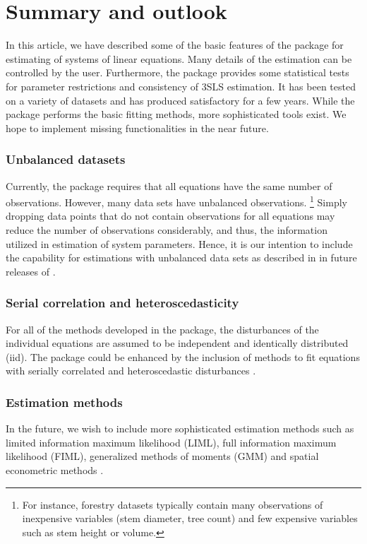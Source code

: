 

\section{Summary and outlook}\label{sec:Summmary}
\nopagebreak
In this article, we have described some of the basic features of the
 package for estimating of systems of linear
equations.
Many details of the estimation can be controlled by the user.
Furthermore, the package provides some statistical tests
for parameter restrictions and consistency of 3SLS estimation.
It has been tested on a variety of datasets and has produced satisfactory
for a few years.
While the  package performs the basic fitting methods,
more sophisticated tools exist.
We hope to implement missing functionalities
in the near future.

\subsubsection*{Unbalanced datasets}
Currently, the  package requires
that all equations have the same number of observations.
However, many data sets have unbalanced observations.%
\footnote{
For instance,
forestry datasets typically contain many observations of inexpensive
variables (stem diameter, tree count) and few expensive variables such
as stem height or volume.
}
Simply dropping data points that do not contain observations for all
equations may reduce the number of observations considerably, and
thus, the information utilized in estimation of system parameters.
Hence, it is our intention to include the capability for estimations
with unbalanced data sets as described in \citet{schmidt77} in future
releases of .

\subsubsection*{Serial correlation and heteroscedasticity}
For all of the methods developed in the package, the disturbances of
the individual equations are assumed to be independent and identically
distributed (iid).
The package could be enhanced by the inclusion of methods to fit
equations with serially correlated and heteroscedastic disturbances
\citep{parks67}. 

\subsubsection*{Estimation methods}
In the future, we wish to include more sophisticated estimation
methods such as limited information maximum likelihood (LIML),
full information maximum likelihood (FIML), generalized methods of
moments (GMM) and spatial econometric methods
\citep{paelinck79,anselin88}.

